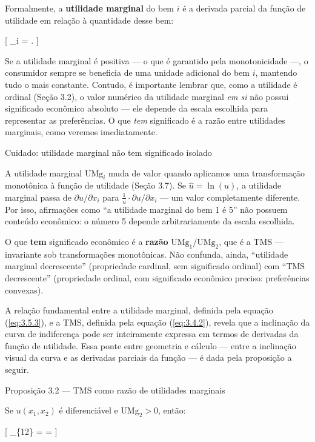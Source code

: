 \documentclass[11pt,twoside,openright]{book}
\begin{document}
Formalmente, a \textbf{utilidade marginal} do bem \(i\) é a derivada
parcial da função de utilidade em relação à quantidade desse bem:

{[} \_i = . \label{eq:3.5.3}
 {]}

Se a utilidade marginal é positiva --- o que é garantido pela
monotonicidade ---, o consumidor sempre se beneficia de uma unidade
adicional do bem \(i\), mantendo tudo o mais constante. Contudo, é
importante lembrar que, como a utilidade é ordinal (Seção 3.2), o valor
numérico da utilidade marginal \emph{em si} não possui significado
econômico absoluto --- ele depende da escala escolhida para representar
as preferências. O que \emph{tem} significado é a razão entre utilidades
marginais, como veremos imediatamente.

\begin{warningbox}{Cuidado: utilidade marginal não tem significado isolado}

A utilidade marginal \(\text{UMg}_i\) muda de valor quando aplicamos uma
transformação monotônica à função de utilidade (Seção 3.7). Se
\(\hat{u} = \ln(u)\), a utilidade marginal passa de
\(\partial u / \partial x_i\) para
\(\frac{1}{u} \cdot \partial u / \partial x_i\) --- um valor
completamente diferente. Por isso, afirmações como ``a utilidade
marginal do bem 1 é 5'' não possuem conteúdo econômico: o número 5
depende arbitrariamente da escala escolhida.

O que \textbf{tem} significado econômico é a \textbf{razão}
\(\text{UMg}_1 / \text{UMg}_2\), que é a TMS --- invariante sob
transformações monotônicas. Não confunda, ainda, ``utilidade marginal
decrescente'' (propriedade cardinal, sem significado ordinal) com ``TMS
decrescente'' (propriedade ordinal, com significado econômico preciso:
preferências convexas).

\end{warningbox}

A relação fundamental entre a utilidade marginal, definida pela equação
(\ref{eq:3.5.3}), e a TMS, definida pela equação (\ref{eq:3.4.2}),
revela que a inclinação da curva de indiferença pode ser inteiramente
expressa em termos de derivadas da função de utilidade. Essa ponte entre
geometria e cálculo --- entre a inclinação visual da curva e as
derivadas parciais da função --- é dada pela proposição a seguir.

\begin{theorembox}{Proposição 3.2 — TMS como razão de utilidades marginais}

Se \(u(x_1, x_2)\) é diferenciável e \(\text{UMg}_2 > 0\), então:

{[} \_\{12\} =  =
\label{eq:3.5.4}  {]}

\end{theorembox}
\end{document}

